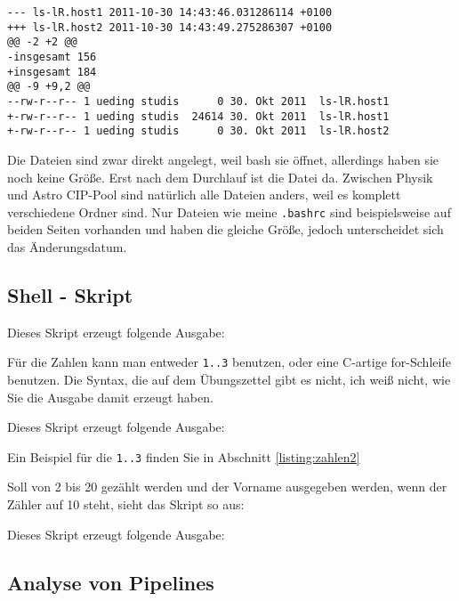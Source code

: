 \documentclass[10pt]{article}
\begin{document}
\begin{lstlisting}
--- ls-lR.host1 2011-10-30 14:43:46.031286114 +0100
+++ ls-lR.host2 2011-10-30 14:43:49.275286307 +0100
@@ -2 +2 @@
-insgesamt 156
+insgesamt 184
@@ -9 +9,2 @@
--rw-r--r-- 1 ueding studis      0 30. Okt 2011  ls-lR.host1
+-rw-r--r-- 1 ueding studis  24614 30. Okt 2011  ls-lR.host1
+-rw-r--r-- 1 ueding studis      0 30. Okt 2011  ls-lR.host2
\end{lstlisting}

Die Dateien sind zwar direkt angelegt, weil bash sie öffnet, allerdings haben sie noch keine Größe. Erst nach dem Durchlauf ist die Datei da. Zwischen Physik und Astro CIP-Pool sind natürlich alle Dateien anders, weil es komplett verschiedene Ordner sind. Nur Dateien wie meine \texttt{.bashrc} sind beispielsweise auf beiden Seiten vorhanden und haben die gleiche Größe, jedoch unterscheidet sich das Änderungsdatum.


\subsection{Shell - Skript}

\lstset{language=bash}


Dieses Skript erzeugt folgende Ausgabe:



Für die Zahlen kann man entweder \texttt{{1..3}} benutzen, oder eine C-artige for-Schleife benutzen. Die Syntax, die auf dem Übungszettel gibt es nicht, ich weiß nicht, wie Sie die Ausgabe damit erzeugt haben.

\lstset{language=bash}


Dieses Skript erzeugt folgende Ausgabe:



Ein Beispiel für die \texttt{{1..3}} finden Sie in Abschnitt \ref{listing:zahlen2}

Soll von 2 bis 20 gezählt werden und der Vorname ausgegeben werden, wenn der Zähler auf 10 steht, sieht das Skript so aus:


\lstset{language=bash}


Dieses Skript erzeugt folgende Ausgabe:




\subsection{Analyse von Pipelines}
\end{document}

